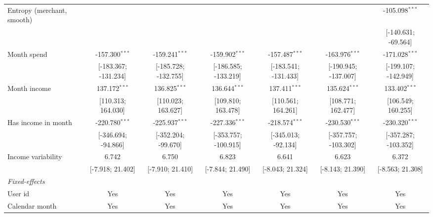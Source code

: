 \begin{table}[htbp]
\begin{threeparttable}[b]
\begin{tabular}{lcccccc}
         Entropy (merchant, smooth) &                      &                      &                      &                      &                      & -105.098$^{***}$\\   
                                    &                      &                      &                      &                      &                      & [-140.631; -69.564]\\   
         Month spend                & -157.300$^{***}$     & -159.241$^{***}$     & -159.902$^{***}$     & -157.487$^{***}$     & -163.976$^{***}$     & -171.028$^{***}$\\   
                                    & [-183.367; -131.234] & [-185.728; -132.755] & [-186.585; -133.219] & [-183.541; -131.433] & [-190.945; -137.007] & [-199.107; -142.949]\\   
         Month income               & 137.172$^{***}$      & 136.825$^{***}$      & 136.644$^{***}$      & 137.411$^{***}$      & 135.624$^{***}$      & 133.402$^{***}$\\   
                                    & [110.313; 164.030]   & [110.023; 163.627]   & [109.810; 163.478]   & [110.561; 164.261]   & [108.771; 162.477]   & [106.549; 160.255]\\   
         Has income in month        & -220.780$^{***}$     & -225.937$^{***}$     & -227.336$^{***}$     & -218.574$^{***}$     & -230.530$^{***}$     & -230.320$^{***}$\\   
                                    & [-346.694; -94.866]  & [-352.204; -99.670]  & [-353.757; -100.915] & [-345.013; -92.134]  & [-357.757; -103.302] & [-357.287; -103.352]\\   
         Income variability         & 6.742                & 6.750                & 6.823                & 6.641                & 6.623                & 6.372\\   
                                    & [-7.918; 21.402]     & [-7.910; 21.410]     & [-7.844; 21.490]     & [-8.043; 21.324]     & [-8.143; 21.390]     & [-8.563; 21.308]\\   
         \midrule
         \emph{Fixed-effects}\\
         User id                    & Yes                  & Yes                  & Yes                  & Yes                  & Yes                  & Yes\\  
         Calendar month             & Yes                  & Yes                  & Yes                  & Yes                  & Yes                  & Yes\\  

\end{tabular}
\end{threeparttable}
\end{table}
